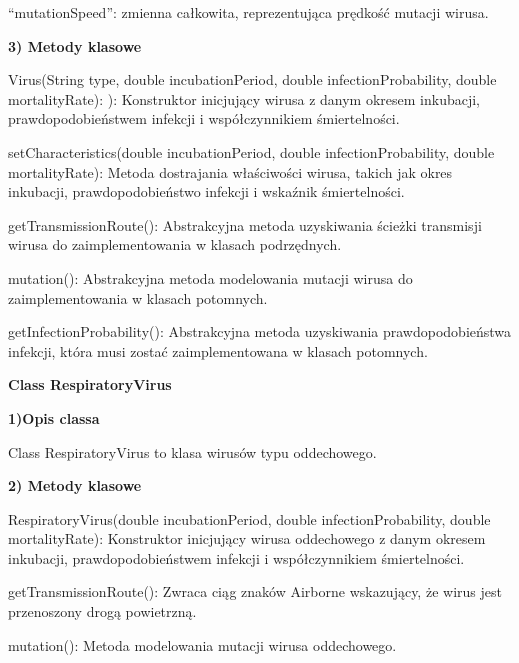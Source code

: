 \documentclass[a4paper]{article}
\begin{document}
\foreignlanguage{polish}{“mutationSpeed”: zmienna całkowita, reprezentująca prędkość mutacji wirusa.}




\foreignlanguage{polish}{\textbf{3) Metody klasowe}}

\foreignlanguage{polish}{Virus(String type, double incubationPeriod, double infectionProbability, double mortalityRate):
): Konstruktor inicjujący wirusa z danym okresem inkubacji, prawdopodobieństwem infekcji i współczynnikiem
śmiertelności.}

\foreignlanguage{polish}{setCharacteristics(double incubationPeriod, double infectionProbability, double mortalityRate):
Metoda dostrajania właściwości wirusa, takich jak okres inkubacji, prawdopodobieństwo infekcji i wskaźnik
śmiertelności.}

\foreignlanguage{polish}{getTransmissionRoute(): Abstrakcyjna metoda uzyskiwania ścieżki transmisji wirusa do
zaimplementowania w klasach podrzędnych.}

\foreignlanguage{polish}{mutation(): Abstrakcyjna metoda modelowania mutacji wirusa do zaimplementowania w klasach
potomnych.}

\foreignlanguage{polish}{getInfectionProbability(): Abstrakcyjna metoda uzyskiwania prawdopodobieństwa infekcji, która
musi zostać zaimplementowana w klasach potomnych.}


\bigskip


\bigskip

{\centering
\foreignlanguage{english}{\textbf{Class RespiratoryVirus}}
\par}
\vspace{6pt}
\foreignlanguage{english}{\textbf{1)Opis classa}}

\foreignlanguage{english}{Class RespiratoryVirus to klasa wirusów typu oddechowego.}


\bigskip

\foreignlanguage{english}{\textbf{2) Metody klasowe}}

\foreignlanguage{english}{RespiratoryVirus(double incubationPeriod, double infectionProbability, double mortalityRate):
Konstruktor inicjujący wirusa oddechowego z danym okresem inkubacji, prawdopodobieństwem infekcji i współczynnikiem
śmiertelności.}

\foreignlanguage{polish}{getTransmissionRoute(): Zwraca ciąg znaków {\textquotedbl}Airborne{\textquotedbl} wskazujący,
że wirus jest przenoszony drogą powietrzną.}

\foreignlanguage{polish}{mutation(): Metoda modelowania mutacji wirusa oddechowego.}
\end{document}
